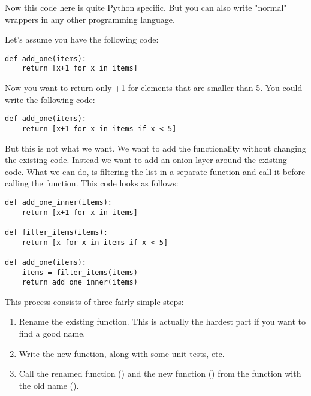 Now this code here is quite Python specific. But you can also write "normal" wrappers in any other programming language.

Let's assume you have the following code:

\begin{programcode}{}
\begin{verbatim}
def add_one(items):
    return [x+1 for x in items]
\end{verbatim}
\end{programcode}

Now you want to return only +1 for elements that are smaller than 5. You could write the following code:

\begin{programcode}{}
\begin{verbatim}
def add_one(items):
    return [x+1 for x in items if x < 5]
\end{verbatim}
\end{programcode}

But this is not what we want. We want to add the functionality without changing the existing code. Instead we want to add an onion layer around the existing code. What we can do, is filtering the list in a separate function and call it before calling the  function. This code looks as follows:

\begin{programcode}{}
\begin{verbatim}
def add_one_inner(items):
    return [x+1 for x in items]

def filter_items(items):
    return [x for x in items if x < 5]

def add_one(items):
    items = filter_items(items)
    return add_one_inner(items)
\end{verbatim}
\end{programcode}

This process consists of three fairly simple steps:
\begin{enumerate}
    \item Rename the existing function. This is actually the hardest part if you want to find a good name.
    \item Write the new function, along with some unit tests, etc.
    \item Call the renamed function () and the new function \newline() from the function with the old name ().
\end{enumerate}

